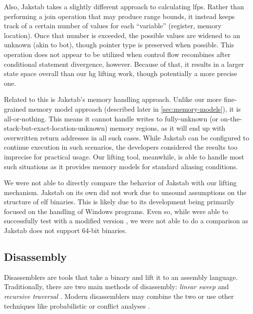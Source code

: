 Also, Jakstab takes a slightly different approach to calculating \acp{lfp}.
Rather than performing a join operation that may produce range bounds,
it instead keeps track of a certain number of values for each ``variable'' (register, memory location).
Once that number is exceeded, the possible values are widened to an unknown (akin to \gls{bot}), though pointer type is preserved when possible.
This operation does not appear to be utilized when control flow recombines
after conditional statement divergence, however.
Because of that, it results in a larger state space overall than our \ac{hg} lifting work, though potentially a more precise one.

Related to this is Jakstab's memory handling approach.
Unlike our more fine-grained memory model approach (described later in \cref{sec:memory-models}), it is all-or-nothing.
This means it cannot handle writes to fully-unknown
(or on-the-stack-but-exact-location-unknown) memory regions,
as it will end up with overwritten return addresses in all such cases.
While Jakstab can be configured to continue execution in such scenarios,
the developers considered the results too imprecise for practical usage.
Our lifting tool, meanwhile, is able to handle most such situations
as it provides memory models for standard aliasing conditions.

\begin{remark}
  We were not able to directly compare the behavior of Jakstab with our lifting mechanism.
  Jakstab on its own did not work due to unsound assumptions on the structure of \ac{elf} binaries.
  This is likely due to its development being primarily focused on the handling of Windows programs.
  Even so, while were able to successfully test with a modified version \autocite{peterson2019},%
  we were not able to do a comparison as Jakstab does not support 64-bit binaries.
\end{remark}

\subsection{Disassembly}\label{related-disassembly}
Disassemblers are tools that take a binary and lift it to an assembly language.
Traditionally, there are two main methods of disassembly: \emph{linear sweep}
and \emph{recursive traversal} \autocite{schwartz2002disassembly}.
Modern disassemblers may combine the two or use other techniques like probabilistic \autocite{wartell2011differentiating,wartell2014shingled,miller2019probabilistic} or conflict analyses \autocite{khadra2016speculative}.

